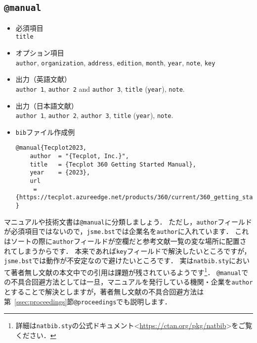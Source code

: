 \documentclass[a4paper,fleqn,uplatex,dvipdfmx]{jsarticle}
\newcommand{\jsmefile}{\texttt{jsme.bst}}
\begin{document}
\subsection{\texttt{@manual}}
\label{ssec:manual}
\begin{screen}
    \begin{itemize}
        \item 必須項目 \\
        \verb|title|
        \item オプション項目 \\
        \verb|author|, \verb|organization|, \verb|address|, \verb|edition|, \verb|month|, \verb|year|, \verb|note|, \verb|key|
        \item 出力（英語文献） \\
            \colorbox[gray]{0.8}{\texttt{author 1}}, \colorbox[gray]{0.8}{\texttt{author 2}} and \colorbox[gray]{0.8}{\texttt{author 3}}, \colorbox[gray]{0.8}{\texttt{title}} (\colorbox[gray]{0.8}{\texttt{year}}), \colorbox[gray]{0.8}{\texttt{note}}.
        \item 出力（日本語文献） \\
            \colorbox[gray]{0.8}{\texttt{author 1}}, \colorbox[gray]{0.8}{\texttt{author 2}}, \colorbox[gray]{0.8}{\texttt{author 3}}, \colorbox[gray]{0.8}{\texttt{title}} (\colorbox[gray]{0.8}{\texttt{year}}), \colorbox[gray]{0.8}{\texttt{note}}.
        \item \verb|bib|ファイル作成例 \vspace{-3mm}
\begin{verbatim}
@manual{Tecplot2023,
    author  = "{Tecplot, Inc.}",
    title   = {Tecplot 360 Getting Started Manual},
    year    = {2023},
    url    
     = {https://tecplot.azureedge.net/products/360/current/360_getting_started.pdf}
}
\end{verbatim}
    \end{itemize}
\end{screen}

マニュアルや技術文書は\verb|@manual|に分類しましょう．
ただし，\verb|author|フィールドが必須項目ではないので，\jsmefile では企業名を\verb|author|に入れています．
これはソートの際に\verb|author|フィールドが空欄だと参考文献一覧の変な場所に配置されてしまうからです．
本来であれば\verb|key|フィールドで解決したいところですが，\jsmefile では動作が不安定なので避けたいところです．
実は\verb|natbib.sty|において著者無し文献の本文中での引用は課題が残されているようです\footnote{詳細は\texttt{natbib.sty}の公式ドキュメント\textless\url{https://ctan.org/pkg/natbib}\textgreater をご覧ください．}．
\verb|@manual|での不具合回避方法としては一旦，マニュアルを発行している機関・企業を\verb|author|とすることで解決としますが，著者無し文献の不具合回避方法は第~\ref{ssec:proceedings}節\verb|@proceedings|でも説明します．
\end{document}
